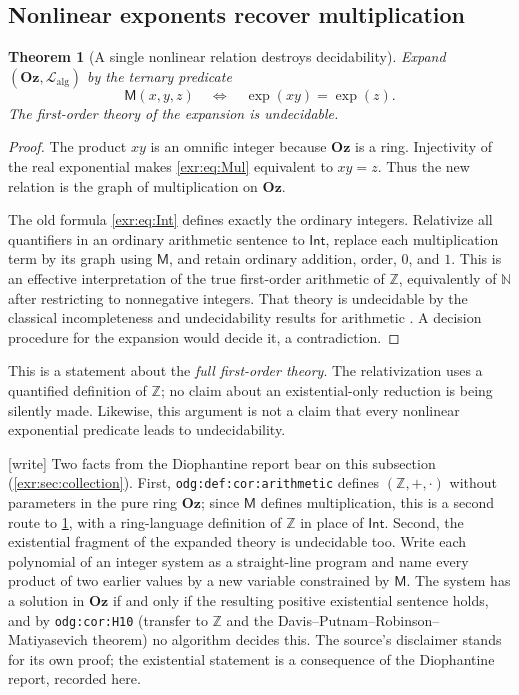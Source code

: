 \documentclass[11pt,letterpaper]{article}
\numberwithin{equation}{section}
\newtheorem{theorem}{Theorem}[section]
\theoremstyle{definition}
\theoremstyle{remark}
\newcommand{\Oz}{\mathbf{Oz}}
\newcommand{\Z}{\mathbb Z}
\newcommand{\N}{\mathbb N}
\newcommand{\Lalg}{\mathcal L_{\mathrm{alg}}}
\newcommand{\Int}{\mathsf{Int}}
\newcommand{\lbl}[1]{\nolinkurl{#1}}%
\newcommand{\wtag}{\textup{[write]}}%
\begin{document}
\subsection{Nonlinear exponents recover multiplication}
\begin{theorem}[A single nonlinear relation destroys decidability]\label{exr:thm:undecidable}
Expand $(\Oz,\Lalg)$ by the ternary predicate
\begin{equation}\label{exr:eq:Mul}
 \mathsf M(x,y,z)\quad\Longleftrightarrow\quad\exp(xy)=\exp(z).
\end{equation}
The first-order theory of the expansion is undecidable.
\end{theorem}
\begin{proof}
The product $xy$ is an omnific integer because $\Oz$ is a ring. Injectivity of the
real exponential makes \eqref{exr:eq:Mul} equivalent to $xy=z$. Thus the new relation
is the graph of multiplication on $\Oz$.

The old formula \eqref{exr:eq:Int} defines exactly the ordinary integers. Relativize
all quantifiers in an ordinary arithmetic sentence to $\Int$, replace each
multiplication term by its graph using $\mathsf M$, and retain ordinary addition,
order, $0$, and $1$. This is an effective interpretation of the true first-order
arithmetic of $\Z$, equivalently of $\N$ after restricting to nonnegative
integers. That theory is undecidable by the classical incompleteness and
undecidability results for arithmetic \cite{salehi,kurahashi}. A decision procedure
for the expansion would decide it, a contradiction.
\end{proof}

This is a statement about the \emph{full first-order theory}. The relativization
uses a quantified definition of $\Z$; no claim about an existential-only reduction
is being silently made. Likewise, this argument is not a claim that every
nonlinear exponential predicate leads to undecidability.

\wtag{} Two facts from the Diophantine report bear on this subsection
(\cref{exr:sec:collection}). First, \lbl{odg:def:cor:arithmetic} defines
$(\Z,+,\cdot)$ without parameters in the pure ring $\Oz$; since $\mathsf M$
defines multiplication, this is a second route to \cref{exr:thm:undecidable},
with a ring-language definition of $\Z$ in place of $\Int$. Second, the
existential fragment of the expanded theory is undecidable too. Write each
polynomial of an integer system as a straight-line program and name every
product of two earlier values by a new variable constrained by $\mathsf M$.
The system has a solution in $\Oz$ if and only if the resulting positive
existential sentence holds, and by \lbl{odg:cor:H10} (transfer to $\Z$ and
the Davis--Putnam--Robinson--Matiyasevich theorem) no algorithm decides this.
The source's disclaimer stands for its own proof; the existential statement
is a consequence of the Diophantine report, recorded here.
\end{document}
